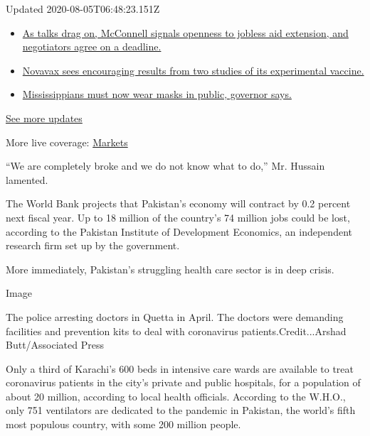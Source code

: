 Updated 2020-08-05T06:48:23.151Z

\begin{itemize}
\tightlist
\item
  \href{https://www.nytimes.com/2020/08/04/world/coronavirus-cases.html?action=click\&pgtype=Article\&state=default\&region=MAIN_CONTENT_1\&context=storylines_live_updates\#link-762df92}{As
  talks drag on, McConnell signals openness to jobless aid extension,
  and negotiators agree on a deadline.}
\item
  \href{https://www.nytimes.com/2020/08/04/world/coronavirus-cases.html?action=click\&pgtype=Article\&state=default\&region=MAIN_CONTENT_1\&context=storylines_live_updates\#link-1228a480}{Novavax
  sees encouraging results from two studies of its experimental
  vaccine.}
\item
  \href{https://www.nytimes.com/2020/08/04/world/coronavirus-cases.html?action=click\&pgtype=Article\&state=default\&region=MAIN_CONTENT_1\&context=storylines_live_updates\#link-794484ed}{Mississippians
  must now wear masks in public, governor says.}
\end{itemize}

\href{https://www.nytimes.com/2020/08/04/world/coronavirus-cases.html?action=click\&pgtype=Article\&state=default\&region=MAIN_CONTENT_1\&context=storylines_live_updates}{See
more updates}

More live coverage:
\href{https://www.nytimes.com/live/2020/08/04/business/stock-market-today-coronavirus?action=click\&pgtype=Article\&state=default\&region=MAIN_CONTENT_1\&context=storylines_live_updates}{Markets}

``We are completely broke and we do not know what to do,'' Mr. Hussain
lamented.

The World Bank projects that Pakistan's economy will contract by 0.2
percent next fiscal year. Up to 18 million of the country's 74 million
jobs could be lost, according to the Pakistan Institute of Development
Economics, an independent research firm set up by the government.

More immediately, Pakistan's struggling health care sector is in deep
crisis.

Image

The police arresting doctors in Quetta in April. The doctors were
demanding facilities and prevention kits to deal with coronavirus
patients.Credit...Arshad Butt/Associated Press

Only a third of Karachi's 600 beds in intensive care wards are available
to treat coronavirus patients in the city's private and public
hospitals, for a population of about 20 million, according to local
health officials. According to the W.H.O., only 751 ventilators are
dedicated to the pandemic in Pakistan, the world's fifth most populous
country, with some 200 million people.

